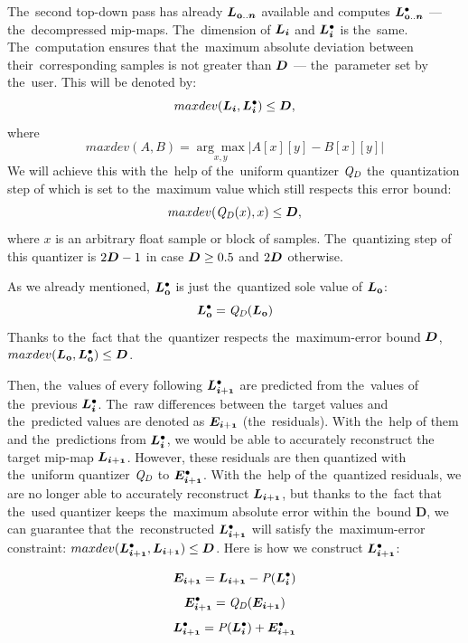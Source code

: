The~second top-down pass has already $\lnorm{0..n}$ available and computes $\ldot{0..n}$ --- the~decompressed mip-maps. The~dimension of $\lnorm{i}$ and $\ldot{i}$ is the~same. The~computation ensures that the~maximum absolute deviation between their~corresponding samples is not greater than $\objnorm{D}{}$ --- the~parameter set by the~user. This will be denoted by:
$$maxdev(\lnorm{i}, \ldot{i}) \leq \objnorm{D}{},$$
where
$$maxdev(A, B) = \underset{x, y}{\arg\max}|A[x][y] - B[x][y]|$$
We will achieve this with the~help of the~uniform quantizer $\mathit{Q_{D}}$ the~quantization step of which is set to the~maximum value which still respects this error bound:
$$maxdev(\dnorm(x), x) \leq \objnorm{D}{},$$
where $x$ is an arbitrary float sample or block of samples.
The~quantizing step of this quantizer is $2\objnorm{D}{} - 1$ in case $\objnorm{D}{} \geq 0.5$ and $2\objnorm{D}{}$ otherwise.


As we already mentioned, $\ldot{0}$ is just the~quantized sole value of $\lnorm{0}$:
$$\ldot{0} = \dnorm(\lnorm{0})$$
Thanks to the~fact that the~quantizer respects the~maximum-error bound $\objnorm{D}{}$, $maxdev(\lnorm{0}, \ldot{0}) \leq \objnorm{D}{}$.


Then, the~values of every following $\ldot{i+1}$ are predicted from the~values of the~previous $\ldot{i}$. The~raw differences between the~target values and the~predicted values are denoted as $\objnorm{E}{i+1}$ (the~residuals). With the~help of them and the~predictions from $\ldot{i}$, we would be able to accurately reconstruct the target mip-map $\lnorm{i+1}$. However, these residuals are then quantized with the~uniform quantizer $\mathit{Q_{D}}$ to $\objdot{E}{i+1}$. With the~help of the~quantized residuals, we are no longer able to accurately reconstruct $\lnorm{i+1}$, but thanks to the~fact that the~used quantizer keeps the~maximum absolute error within the~bound $\mathbold{D}$, we can guarantee that the~reconstructed $\ldot{i+1}$ will satisfy the~maximum-error constraint: $maxdev(\ldot{i+1}, \lnorm{i+1}) \leq \objnorm{D}{}$. Here is how we construct $\ldot{i+1}$:

$$\objnorm{E}{i+1} = \lnorm{i+1} - \opnorm{P}{}(\ldot{i})$$
$$\objdot{E}{i+1} = \opnorm{Q}{D}(\objnorm{E}{i+1})$$
\begin{equation}
\label{eq:nextLevel}
\ldot{i+1} = \opnorm{P}{}(\ldot{i}) + \objdot{E}{i+1}
\end{equation}

